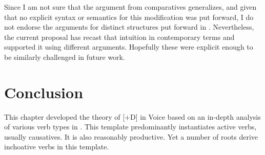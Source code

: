 \begin{exe}
\begin{xlist}
\begin{xlist}
\begin{exe}
\begin{exe}
\begin{xlist}
\begin{exe}
\begin{xlist}
\begin{exe}
\begin{xlist}
\begin{xlist}
\begin{exe}
\begin{xlist}
\begin{exe}
\begin{xlist}
\begin{exe}
\begin{exe}
\begin{exe}
\begin{xlist}
\begin{exe}
\begin{exe}
\begin{xlist}
\begin{xlist}
\begin{exe}
\begin{xlist}
\begin{exe}
\begin{exe}
\begin{exe}
\begin{xlist}
\begin{exe}
\begin{exe}
\begin{xlist}
\begin{exe}
\begin{xlist}
\begin{exe}
\begin{xlist}
\begin{exe}
\begin{xlist}
\begin{exe}
\begin{exe}
\begin{xlist}
\begin{exe}
\begin{exe}
\begin{xlist}
\begin{xlist}
\begin{exe}
\begin{xlist}
\begin{xlist}
\begin{exe}
\begin{xlist}
\begin{exe}
\begin{xlist}
\begin{exe}
\begin{xlist}
\begin{exe}
\begin{xlist}
\begin{exe}
\begin{exe}
\begin{exe}
\begin{exe}
\begin{xlist}
\begin{exe}
\begin{exe}
\begin{xlist}
\begin{xlist}
\begin{exe}
\begin{exe}
\begin{xlist}
\begin{exe}
\begin{xlist}
\begin{exe}
\begin{xlist}
\begin{exe}
\begin{xlist}
\begin{exe}
\begin{xlist}
\begin{exe}
\begin{exe}
\begin{exe}
\begin{exe}
\begin{xlist}
\begin{exe}
\begin{xlist}
\begin{exe}
\begin{xlist}
\begin{exe}
\begin{xlist}
\begin{exe}
\begin{xlist}
\begin{exe}
\begin{xlist}
\begin{exe}
Since I am not sure that the argument from comparatives generalizes, and given that no explicit syntax or semantics for this modification was put forward, I do not endorse the arguments for distinct structures put forward in \cite{borer91}. Nevertheless, the current proposal has recast that intuition in contemporary terms and supported it using different arguments. Hopefully these were explicit enough to be similarly challenged in future work.


\section{Conclusion} \label{vd:sum}
This chapter developed the theory of [\!+\!D] in Voice based on an in-depth analysis of various verb types in {\thif}.
This template predominantly instantiates active verbs, usually causatives. It is also reasonably productive. Yet a number of roots derive inchoative verbs in this template.


\end{exe}
\end{xlist}
\end{exe}
\end{xlist}
\end{exe}
\end{xlist}
\end{exe}
\end{xlist}
\end{exe}
\end{xlist}
\end{exe}
\end{xlist}
\end{exe}
\end{exe}
\end{exe}
\end{exe}
\end{xlist}
\end{exe}
\end{xlist}
\end{exe}
\end{xlist}
\end{exe}
\end{xlist}
\end{exe}
\end{xlist}
\end{exe}
\end{exe}
\end{xlist}
\end{xlist}
\end{exe}
\end{exe}
\end{xlist}
\end{exe}
\end{exe}
\end{exe}
\end{exe}
\end{xlist}
\end{exe}
\end{xlist}
\end{exe}
\end{xlist}
\end{exe}
\end{xlist}
\end{exe}
\end{xlist}
\end{xlist}
\end{exe}
\end{xlist}
\end{xlist}
\end{exe}
\end{exe}
\end{xlist}
\end{exe}
\end{exe}
\end{xlist}
\end{exe}
\end{xlist}
\end{exe}
\end{xlist}
\end{exe}
\end{xlist}
\end{exe}
\end{exe}
\end{xlist}
\end{exe}
\end{exe}
\end{exe}
\end{xlist}
\end{exe}
\end{xlist}
\end{xlist}
\end{exe}
\end{exe}
\end{xlist}
\end{exe}
\end{exe}
\end{exe}
\end{xlist}
\end{exe}
\end{xlist}
\end{exe}
\end{xlist}
\end{xlist}
\end{exe}
\end{xlist}
\end{exe}
\end{xlist}
\end{exe}
\end{exe}
\end{xlist}
\end{xlist}
\end{exe}
